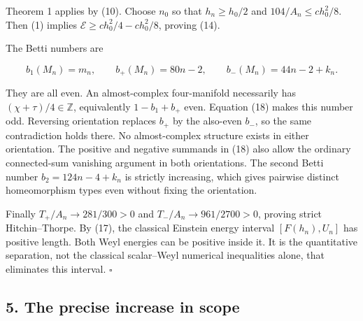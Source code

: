 \documentclass[
  11pt,
]{article}
\begin{document}
Theorem 1 applies by (10). Choose \(n_0\) so that \(h_n\ge h_0/2\) and
\(104/A_n\le c h_0^2/8\). Then (1) implies
\(\mathcal E\ge ch_0^2/4-ch_0^2/8\), proving (14).

The Betti numbers are

\[
 b_1(M_n)=m_n,\qquad b_+(M_n)=80n-2,\qquad
 b_-(M_n)=44n-2+k_n.
 \tag{18}
\]

They are all even. An almost-complex four-manifold necessarily has
\((\chi+\tau)/4\in\mathbb Z\), equivalently \(1-b_1+b_+\) even. Equation
(18) makes this number odd. Reversing orientation replaces \(b_+\) by
the also-even \(b_-\), so the same contradiction holds there. No
almost-complex structure exists in either orientation. The positive and
negative summands in (18) also allow the ordinary connected-sum
vanishing argument in both orientations. The second Betti number
\(b_2=124n-4+k_n\) is strictly increasing, which gives pairwise distinct
homeomorphism types even without fixing the orientation.

Finally \(T_+/A_n\to281/300>0\) and \(T_-/A_n\to961/2700>0\), proving
strict Hitchin--Thorpe. By (17), the classical Einstein energy interval
\([F(h_n),U_n]\) has positive length. Both Weyl energies can be positive
inside it. It is the quantitative separation, not the classical
scalar--Weyl numerical inequalities alone, that eliminates this
interval. \(\square\)

\hypertarget{the-precise-increase-in-scope}{%
\subsection{5. The precise increase in
scope}\label{the-precise-increase-in-scope}}
\end{document}
